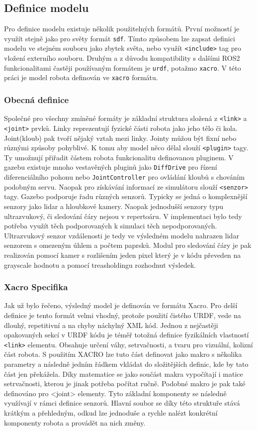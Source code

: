 \subsection*{Definice modelu}
Pro definice modelu existuje několik použitelných formátů. První možností je využít stejně jako pro světy formát \verb|sdf|. Tímto způsobem lze zapsat definici modelu ve stejném souboru jako zbytek světa, nebo využít \verb|<include>| tag pro vložení externího souboru. Druhým a z důvodu kompatibility s dalšími ROS2 funkcionalitami častěji používaným formátem je \verb|urdf|, potažmo \verb|xacro|. V této práci je model robota definován ve \verb|xacro| formátu. 

\subsubsection*{Obecná definice}
Společné pro všechny zmíněné formáty je základní struktura složená z \verb|<link>| a \verb|<joint>| prvků. Linky reprezentují fyzické části robota jako jeho tělo či kola. Joint(kloub) pak tvoří nějaký vztah mezi linky. Jointy můžou být fixní nebo různými způsoby pohyblivé. K tomu aby model něco dělal slouží \verb|<plugin>| tagy. Ty umožnují přiřadit částem robota funkcionalitu definovanou pluginem. V gazebu existuje mnoho vestavěných pluginů jako \verb|DiffDrive| pro řízení diferenciálního pohonu nebo \verb|JointController| pro ovládání kloubů s chováním podobným servu. Naopak pro získávání informací ze simulátoru slouží \verb|<senzor>| tagy. Gazebo podporuje řadu různých senzorů. Typicky se jedná o komplexnější senzory jako lidar a hloubkové kamery. Naopak jednodušší senzory typu ultrazvukový, či sledování čáry nejsou v repertoáru. V implementaci bylo tedy potřeba využít těch podporovaných k simulaci těch nepodporovaných. Ultrazvukový senzor vzdálenosti je tedy ve výsledném modelu nahrazen lidar senzorem s omezeným úhlem a počtem paprsků. Modul pro sledování čáry je pak realizován pomocí kamer s rozlišením jeden pixel který je v kódu převeden na grayscale hodnotu a pomocí treasholdingu rozhodnut výsledek.

\subsubsection*{Xacro Specifika}
Jak už bylo řečeno, výsledný model je definován ve formátu Xacro. Pro delší definice je tento formát velmi vhodný, protože použití čistého URDF, vede na dlouhý, repetitivní a na chyby náchylný XML kód. Jednou z nejčastěji opakovaných sekcí v URDF kódu je téměř totožná definice fyzikálních vlastností \verb|<link>| elementu. Obsahuje určení váhy, setrvačnosti, a tvaru pro vizuální, kolizní část robota. S použitím XACRO lze tuto část definovat jako makro s několika parametry a následně jedním řádkem vkládat do složitějších definic, kde by tato část jen překážela. Díky matematice se jako součást makra vypočítají i matice setrvačnosti, kterou je jinak potřeba počítat ručně. Podobné makro je pak také definováno pro <joint> elementy. Tyto základní komponenty se následně využívají v rámci definice senzorů. Hlavní soubor se díky této struktuře stává krátkým a přehledným, odkud lze jednoduše a rychle nalézt konkrétní komponenty robota a provádět na nich změny.

